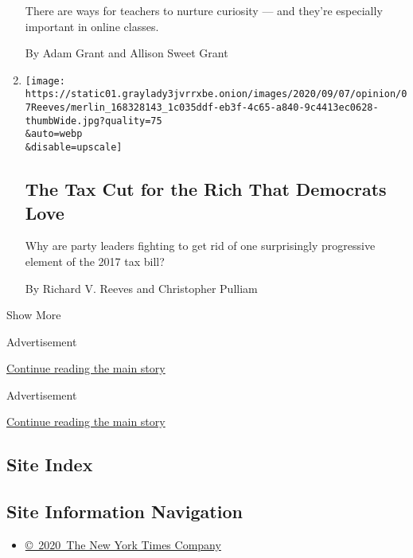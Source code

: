 \begin{enumerate}
  There are ways for teachers to nurture curiosity --- and they're
  especially important in online classes.

  By Adam Grant and Allison Sweet Grant
\item
  \href{/2020/09/07/opinion/salt-tax-deduction-cut.html}{}

  \texttt{[image: https://static01.graylady3jvrrxbe.onion/images/2020/09/07/opinion/07Reeves/merlin\_168328143\_1c035ddf-eb3f-4c65-a840-9c4413ec0628-thumbWide.jpg?quality=75\\\&auto=webp\\\&disable=upscale]}

  \hypertarget{the-tax-cut-for-the-rich-that-democrats-love}{%
  \subsection{The Tax Cut for the Rich That Democrats
  Love}\label{the-tax-cut-for-the-rich-that-democrats-love}}

  Why are party leaders fighting to get rid of one surprisingly
  progressive element of the 2017 tax bill?

  By Richard V. Reeves and Christopher Pulliam
\end{enumerate}

Show More

Advertisement

\protect\hyperlink{after-mid1}{Continue reading the main story}

Advertisement

\protect\hyperlink{after-mktg}{Continue reading the main story}

\hypertarget{site-index}{%
\subsection{Site Index}\label{site-index}}

\hypertarget{site-information-navigation}{%
\subsection{Site Information
Navigation}\label{site-information-navigation}}

\begin{itemize}
\tightlist
\item
  \href{https://help.nytimes3xbfgragh.onion/hc/en-us/articles/115014792127-Copyright-notice}{©~2020~The
  New York Times Company}
\end{itemize}

